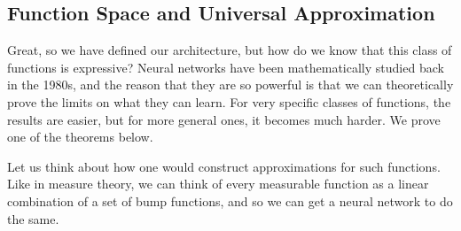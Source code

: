 \documentclass{article}
\begin{document}
\subsection{Function Space and Universal Approximation} 

  Great, so we have defined our architecture, but how do we know that this class of functions is expressive? Neural networks have been mathematically studied back in the 1980s, and the reason that they are so powerful is that we can theoretically prove the limits on what they can learn. For very specific classes of functions, the results are easier, but for more general ones, it becomes much harder. We prove one of the theorems below. 

  Let us think about how one would construct approximations for such functions. Like in measure theory, we can think of every measurable function as a linear combination of a set of bump functions, and so we can get a neural network to do the same.
\end{document}
